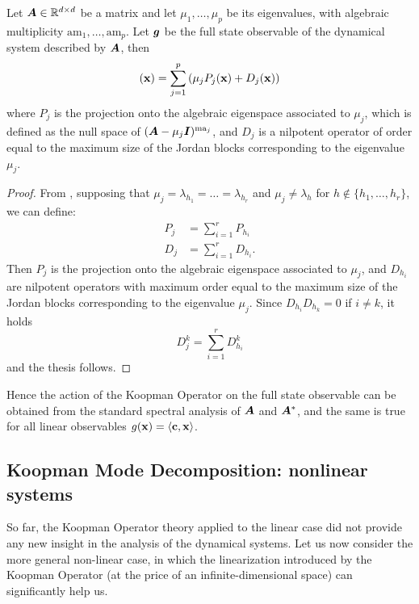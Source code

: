 \begin{corollary}
Let $\vb*{A}\in\mathbb{R}^{d\times d}$ be a matrix and let $\mu_1, \dots, \mu_p$ be its eigenvalues, with algebraic multiplicity $\mathrm{am}_1, \dots, \mathrm{am}_p$. Let $\vb*{g}$ be the full state observable of the dynamical system described by $\vb*{A}$, then
\begin{equation*}
    [\mathcal{K}\vb{g}](\vb{x}) = \sum_{j = 1}^{p} \left(\mu_j P_j(\vb{x}) + D_j(\vb{x}) \right)
\end{equation*}
where $P_j$ is the projection onto the algebraic eigenspace associated to $\mu_j$, which is defined as the null space of $(\vb*{A} - \mu_j\vb*{I})^{\mathrm{ma}_j}$, and $D_j$ is a nilpotent operator of order equal to the maximum size of the Jordan blocks corresponding to the eigenvalue $\mu_j$. 
\end{corollary}
\begin{proof}
From , supposing that $\mu_j = \lambda_{h_1} = \dots = \lambda_{h_r}$ and $\mu_j \neq \lambda_{h}$ for $h\notin\{h_1,\dots, h_r\}$, we can define:
\begin{equation*}
    \begin{split}
        P_j &= \sum_{i=1}^r P_{h_i}\\
        D_j &= \sum_{i=1}^r D_{h_i}.
    \end{split}
\end{equation*}
Then $P_j$ is the projection onto the algebraic eigenspace associated to $\mu_j$, and $D_{h_i}$ are nilpotent operators with maximum order equal to the maximum size of the Jordan blocks corresponding to the eigenvalue $\mu_j$. Since $D_{h_i}D_{h_k} = 0$ if $i\neq k$, it holds
\begin{equation*}
    D_j^k = \sum_{i=1}^r D_{h_i}^k
\end{equation*}
and the thesis follows.
\end{proof}

Hence the action of the Koopman Operator on the full state observable can be obtained from the standard spectral analysis of $\vb*{A}$ and $\vb*{A}^*$, and the same is true for all linear observables $g(\vb{x}) = \langle \vb{c}, \vb{x} \rangle$.

\subsection{Koopman Mode Decomposition: nonlinear systems}
So far, the Koopman Operator theory applied to the linear case did not provide any new insight in the analysis of the dynamical systems. Let us now consider the more general non-linear case, in which the linearization introduced by the Koopman Operator (at the price of an infinite-dimensional space) can significantly help us.

